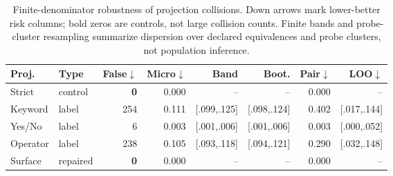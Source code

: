 \begin{table}[t]
\centering
\caption{Finite-denominator robustness of projection collisions.  Down arrows mark lower-better risk columns; bold zeros are controls, not large collision counts.  Finite bands and probe-cluster resampling summarize dispersion over declared equivalences and probe clusters, not population inference.}
\label{tab:robustness-detail}
\footnotesize
\setlength{\tabcolsep}{2.0pt}
\begin{tabular}{@{}llrrrrrr@{}}
\toprule
Proj. & Type & False$\downarrow$ & Micro$\downarrow$ & Band & Boot. & Pair$\downarrow$ & LOO$\downarrow$ \\
\midrule
Strict & control & \textbf{0} & 0.000 & -- & -- & 0.000 & -- \\
Keyword & label & 254 & 0.111 & [.099,.125] & [.098,.124] & 0.402 & [.017,.144] \\
Yes/No & label & 6 & 0.003 & [.001,.006] & [.001,.006] & 0.003 & [.000,.052] \\
Operator & label & 238 & 0.105 & [.093,.118] & [.094,.121] & 0.290 & [.032,.148] \\
Surface & repaired & \textbf{0} & 0.000 & -- & -- & 0.000 & -- \\
\bottomrule
\end{tabular}
\end{table}
